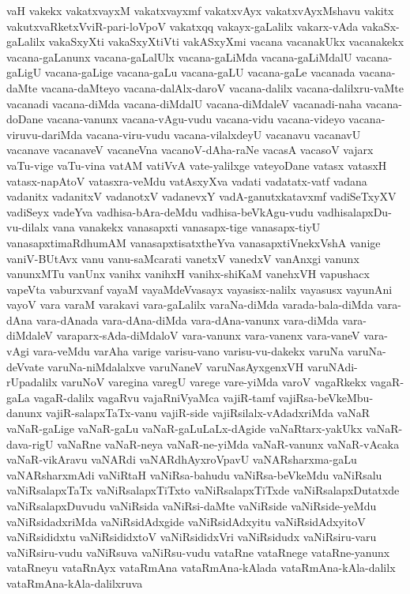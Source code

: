 {vaH
vakekx
vakatxvayxM
vakatxvayxmf
vakatxvAyx
vakatxvAyxMshavu
vakitx
vakutxvaRketxVviR-pari-loVpoV
vakatxqq
vakayx-gaLalilx
vakarx-vAda
vakaSx-gaLalilx
vakaSxyXti
vakaSxyXtiVti
vakASxyXmi
vacana
vacanakUkx
vacanakekx
vacana-gaLanunx
vacana-gaLalUlx
vacana-gaLiMda
vacana-gaLiMdalU
vacana-gaLigU
vacana-gaLige
vacana-gaLu
vacana-gaLU
vacana-gaLe
vacanada
vacana-daMte
vacana-daMteyo
vacana-dalAlx-daroV
vacana-dalilx
vacana-dalilxru-vaMte
vacanadi
vacana-diMda
vacana-diMdalU
vacana-diMdaleV
vacanadi-naha
vacana-doDane
vacana-vanunx
vacana-vAgu-vudu
vacana-vidu
vacana-videyo
vacana-viruvu-dariMda
vacana-viru-vudu
vacana-vilalxdeyU
vacanavu
vacanavU
vacanave
vacanaveV
vacaneVna
vacanoV-dAha-raNe
vacasA
vacasoV
vajarx
vaTu-vige
vaTu-vina
vatAM
vatiVvA
vate-yalilxge
vateyoDane
vatasx
vatasxH
vatasx-napAtoV
vatasxra-veMdu
vatAsxyXva
vadati
vadatatx-vatf
vadana
vadanitx
vadanitxV
vadanotxV
vadanevxY
vadA-ganutxkatavxmf
vadiSeTxyXV
vadiSeyx
vadeYva
vadhisa-bAra-deMdu
vadhisa-beVkAgu-vudu
vadhisalapxDu-vu-dilalx
vana
vanakekx
vanasapxti
vanasapx-tige
vanasapx-tiyU
vanasapxtimaRdhumAM
vanasapxtisatxtheYva
vanasapxtiVnekxVshA
vanige
vaniV-BUtAvx
vanu
vanu-saMcarati
vanetxV
vanedxV
vanAnxgi
vanunx
vanunxMTu
vanUnx
vanihx
vanihxH
vanihx-shiKaM
vanehxVH
vapushacx
vapeVta
vaburxvanf
vayaM
vayaMdeVvasayx
vayasisx-nalilx
vayasusx
vayunAni
vayoV
vara
varaM
varakavi
vara-gaLalilx
varaNa-diMda
varada-bala-diMda
vara-dAna
vara-dAnada
vara-dAna-diMda
vara-dAna-vanunx
vara-diMda
vara-diMdaleV
varaparx-sAda-diMdaloV
vara-vanunx
vara-vanenx
vara-vaneV
vara-vAgi
vara-veMdu
varAha
varige
varisu-vano
varisu-vu-dakekx
varuNa
varuNa-deVvate
varuNa-niMdalalxve
varuNaneV
varuNasAyxgenxVH
varuNAdi-rUpadalilx
varuNoV
varegina
varegU
varege
vare-yiMda
varoV
vagaRkekx
vagaR-gaLa
vagaR-dalilx
vagaRvu
vajaRniVyaMca
vajiR-tamf
vajiRsa-beVkeMbu-danunx
vajiR-salapxTaTx-vanu
vajiR-side
vajiRsilalx-vAdadxriMda
vaNaR
vaNaR-gaLige
vaNaR-gaLu
vaNaR-gaLuLaLx-dAgide
vaNaRtarx-yakUkx
vaNaR-dava-rigU
vaNaRne
vaNaR-neya
vaNaR-ne-yiMda
vaNaR-vanunx
vaNaR-vAcaka
vaNaR-vikAravu
vaNARdi
vaNARdhAyxroVpavU
vaNARsharxma-gaLu
vaNARsharxmAdi
vaNiRtaH
vaNiRsa-bahudu
vaNiRsa-beVkeMdu
vaNiRsalu
vaNiRsalapxTaTx
vaNiRsalapxTiTxto
vaNiRsalapxTiTxde
vaNiRsalapxDutatxde
vaNiRsalapxDuvudu
vaNiRsida
vaNiRsi-daMte
vaNiRside
vaNiRside-yeMdu
vaNiRsidadxriMda
vaNiRsidAdxgide
vaNiRsidAdxyitu
vaNiRsidAdxyitoV
vaNiRsididxtu
vaNiRsididxtoV
vaNiRsididxVri
vaNiRsidudx
vaNiRsiru-varu
vaNiRsiru-vudu
vaNiRsuva
vaNiRsu-vudu
vataRne
vataRnege
vataRne-yanunx
vataRneyu
vataRnAyx
vataRmAna
vataRmAna-kAlada
vataRmAna-kAla-dalilx
vataRmAna-kAla-dalilxruva
}
